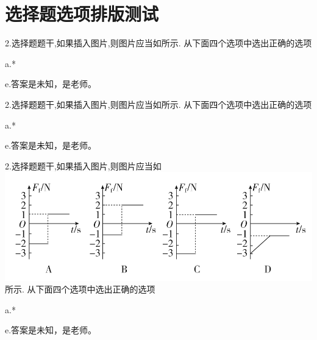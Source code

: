 \documentclass[a4paper,fontset = windows]{ctexbook}
\begin{document}
\chapter{选择题选项排版测试}

 \begin{choices}
   2.选择题题干,如果插入图片,则图片应当如所示.
    从下面四个选项中选出正确的选项

    a.*

    e.答案是未知，是老师。

   2.选择题题干,如果插入图片,则图片应当如所示.
    从下面四个选项中选出正确的选项

    a.*

    e.答案是未知，是老师。

   2.选择题题干,如果插入图片,则图片应当如\includegraphics{1.png}所示.
    从下面四个选项中选出正确的选项

    a.*

    e.答案是未知，是老师。

 \end{choices}

 \makeanswer
\end{document}
